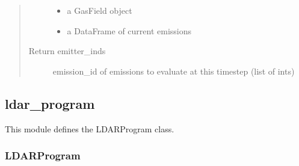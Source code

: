 \documentclass[letterpaper,10pt,english]{sphinxmanual}
\begin{document}
\begin{fulllineitems}
\begin{fulllineitems}
\begin{quote}
\begin{description}
\begin{itemize}
\item {} 
 \textendash{} a GasField object

\item {} 
 \textendash{} a DataFrame of current emissions

\end{itemize}

\item[{Return emitter\_inds}] \leavevmode
emission\_id of emissions to evaluate at this timestep (list of ints)

\end{description}\end{quote}

\end{fulllineitems}


\end{fulllineitems}



\subsection{ldar\_program}
\label{\detokenize{index:module-feast.DetectionModules.ldar_program}}\label{\detokenize{index:ldar-program}}
This module defines the LDARProgram class.


\subsubsection{LDARProgram}
\label{\detokenize{index:ldarprogram}}
\end{document}
